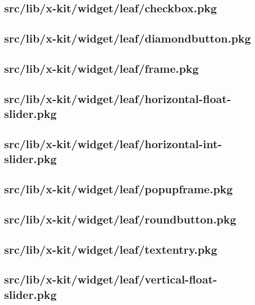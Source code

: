 \subsection{src/lib/x-kit/widget/leaf/checkbox.pkg}


\subsection{src/lib/x-kit/widget/leaf/diamondbutton.pkg}


\subsection{src/lib/x-kit/widget/leaf/frame.pkg}


\subsection{src/lib/x-kit/widget/leaf/horizontal-float-slider.pkg}


\subsection{src/lib/x-kit/widget/leaf/horizontal-int-slider.pkg}


\subsection{src/lib/x-kit/widget/leaf/popupframe.pkg}


\subsection{src/lib/x-kit/widget/leaf/roundbutton.pkg}


\subsection{src/lib/x-kit/widget/leaf/textentry.pkg}


\subsection{src/lib/x-kit/widget/leaf/vertical-float-slider.pkg}


